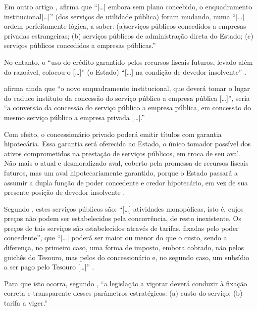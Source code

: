 \documentclass[
	10pt,				%
	openright,			%
	twoside,			%
	a5paper,			%
	english,			%
	french,				%
	spanish,			%
	brazil				%
	]{abntex2}
\renewenvironment{quote}
  {\small\list{}{\rightmargin=0.1cm \leftmargin=4cm}%
   \item\relax}
  {\endlist}
\begin{document}
Em outro artigo \cite[p.~717]{rangel1987}, 
afirma que ``{[}\ldots{}{]} embora sem plano concebido, o enquadramento
institucional{[}\ldots{}{]}'' (dos serviços de utilidade pública) foram
mudando, numa ``{[}\ldots{}{]} ordem perfeitamente lógica, a saber:
(a)serviços públicos concedidos a empresas privadas estrangeiras; (b)
serviços públicos de administração direta do Estado; (c) serviços
públicos concedidos a empresas públicas.''

No entanto, o ``uso do crédito garantido pelos recursos fiscais futuros,
levado além do razoável, colocou-o {[}\ldots{}{]}'' (o Estado)
``{[}\ldots{}{]} na condição de devedor insolvente''
\cite[p.~718]{rangel1987}.

 afirma ainda que ``o novo enquadramento
institucional, que deverá tomar o lugar do caduco instituto da concessão
do serviço público a empresa pública {[}\ldots{}{]}'', seria ``a
conversão da concessão do serviço público a empresa pública, em
concessão do mesmo serviço público a empresa privada {[}\ldots{}{]}.''

\begin{quote}
Com efeito, o concessionário privado poderá emitir títulos com garantia
hipotecária. Essa garantia será oferecida ao Estado, o único tomador
possível dos ativos comprometidos na prestação de serviços públicos, em
troca de seu aval. Não mais o atual e desmoralizado aval, coberto pela
promessa de recursos fiscais futuros, mas um aval hipotecariamente
garantido, porque o Estado passará a assumir a dupla função de poder
concedente e credor hipotecário, em vez de sua presente posição de
devedor insolvente \cite[p.~719]{rangel1987}.
\end{quote}

Segundo , estes serviços públicos são:
``{[}\ldots{}{]} atividades monopólicas, isto é, cujos preços não podem
ser estabelecidos pela concorrência, de resto inexistente. Os preços de
tais serviços são estabelecidos através de tarifas, fixadas pelo poder
concedente'', que ``{[}\ldots{}{]} poderá ser maior ou menor do que o
custo, sendo a diferença, no primeiro caso, uma forma de imposto, embora
cobrado, não pelos guichês do Tesouro, mas pelos do concessionário e, no
segundo caso, um subsídio a ser pago pelo Tesouro {[}\ldots{}{]}''
\cite[p.~721]{rangel1987}.

Para que isto ocorra, segundo , ``a
legislação a vigorar deverá conduzir à fixação correta e transparente
desses parâmetros estratégicos: (a) custo do serviço; (b) tarifa a
viger.''
\end{document}
